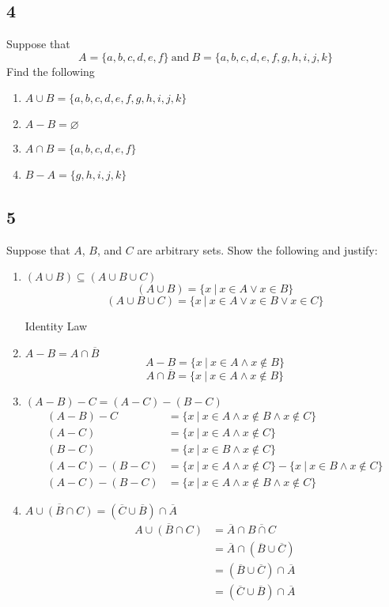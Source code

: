 \documentclass[letterpaper, 12pt]{math}
\begin{document}
\subsection*{4}
Suppose that
\[ A = \{a,b,c,d,e,f\}\ \mathrm{and}\ B = \{a,b,c,d,e,f,g,h,i,j,k\} \]
Find the following
\begin{enumerate}
  \item \( A\cup B = \{a,b,c,d,e,f,g,h,i,j,k\} \)
  \item \( A-B = \varnothing \)
  \item \( A\cap B = \{a,b,c,d,e,f\} \)
  \item \( B-A = \{g,h,i,j,k\} \)
\end{enumerate}

\subsection*{5}
Suppose that \( A \), \( B \), and \( C \) are arbitrary sets. Show the
following and justify:
\begin{enumerate}
  \item \( (A\cup B) \subseteq (A\cup B\cup C) \)
  \[ (A\cup B) = \{x\ |\ x \in A \vee x \in B \} \]
  \[ (A\cup B\cup C) = \{x\ |\ x \in A \vee x \in B \vee x \in C\} \]
  \begin{center}
    Identity Law
  \end{center}
  \item \( A-B = A\cap \overline{B} \)
  \[ A-B = \{x\ |\ x \in A \wedge x \notin B\} \]
  \[ A\cap \overline{B} = \{x\ |\ x \in A \wedge x \notin B\} \]
  \item \( (A-B)-C = (A-C)-(B-C) \)
  \begin{align*}
    (A-B)-C &= \{x\ |\ x \in A \wedge x \notin B \wedge x \notin C\} \\
    (A-C) &= \{x\ |\ x \in A \wedge x \notin C\} \\
    (B-C) &= \{x\ |\ x \in B \wedge x \notin C\} \\
    (A-C)-(B-C) &= \{x\ |\ x \in A \wedge x \notin C\}-
     \{x\ |\ x \in B \wedge x \notin C\} \\
    (A-C)-(B-C) &= \{x\ |\ x \in A \wedge x \notin B \wedge x \notin C\}
  \end{align*}
  \item \( \overline{A \cup (B \cap C)} = (\overline{C} \cup \overline{B}) \cap
     \overline{A} \)
  \begin{align*}
    \overline{A \cup (B \cap C)} &=
      \overline{A} \cap \overline{B \cap C} \\
    &= \overline{A} \cap (\overline{B} \cup \overline{C}) \\
    &= (\overline{B} \cup \overline{C}) \cap \overline{A} \\
    &= (\overline{C} \cup \overline{B}) \cap \overline{A}
  \end{align*}
\end{enumerate}
\end{document}
